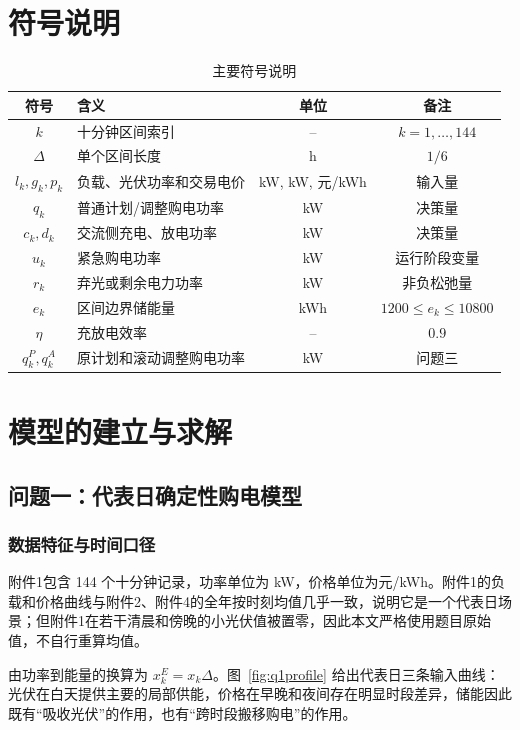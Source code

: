 \documentclass[withoutpreface]{cumcmthesis}
\begin{document}
\section{符号说明}
\begin{table}[H]
\centering
\caption{主要符号说明}\label{tab:symbols}
\begin{tabularx}{0.95\textwidth}{cLcc}
\toprule
符号 & 含义 & 单位 & 备注\\
\midrule
$k$ & 十分钟区间索引 & -- & $k=1,\ldots,144$\\
$\Delta$ & 单个区间长度 & h & $1/6$\\
$l_k,g_k,p_k$ & 负载、光伏功率和交易电价 & kW, kW, 元/kWh & 输入量\\
$q_k$ & 普通计划/调整购电功率 & kW & 决策量\\
$c_k,d_k$ & 交流侧充电、放电功率 & kW & 决策量\\
$u_k$ & 紧急购电功率 & kW & 运行阶段变量\\
$r_k$ & 弃光或剩余电力功率 & kW & 非负松弛量\\
$e_k$ & 区间边界储能量 & kWh & $1200\le e_k\le10800$\\
$\eta$ & 充放电效率 & -- & $0.9$\\
$q_k^P,q_k^A$ & 原计划和滚动调整购电功率 & kW & 问题三\\
\bottomrule
\end{tabularx}
\end{table}

\section{模型的建立与求解}
\subsection{问题一：代表日确定性购电模型}
\subsubsection{数据特征与时间口径}
附件1包含 144 个十分钟记录，功率单位为 kW，价格单位为元/kWh。附件1的负载和价格曲线与附件2、附件4的全年按时刻均值几乎一致，说明它是一个代表日场景；但附件1在若干清晨和傍晚的小光伏值被置零，因此本文严格使用题目原始值，不自行重算均值。

由功率到能量的换算为 $x_k^{E}=x_k\Delta$。图~\ref{fig:q1profile} 给出代表日三条输入曲线：光伏在白天提供主要的局部供能，价格在早晚和夜间存在明显时段差异，储能因此既有“吸收光伏”的作用，也有“跨时段搬移购电”的作用。
\end{document}

